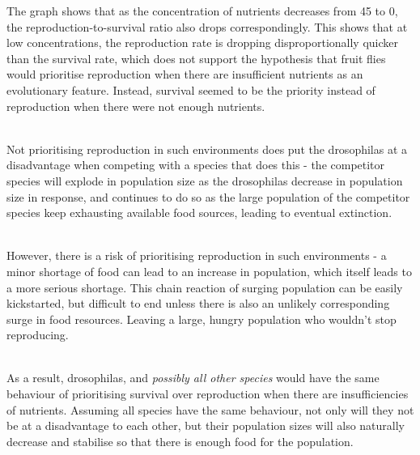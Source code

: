 \documentclass{article}
\begin{document}
\noindent
The graph shows that as the concentration of nutrients decreases from 45 to 0, the reproduction-to-survival ratio also drops correspondingly. This shows that at low concentrations, the reproduction rate is dropping disproportionally quicker than the survival rate, which does not support the hypothesis that fruit flies would prioritise reproduction when there are insufficient nutrients as an evolutionary feature. Instead, survival seemed to be the priority instead of reproduction when there were not enough nutrients.

\noindent\\
Not prioritising reproduction in such environments does put the drosophilas at a disadvantage when competing with a species that does this - the competitor species will explode in population size as the drosophilas decrease in population size in response, and continues to do so as the large population of the competitor species keep exhausting available food sources, leading to eventual extinction.

\noindent\\
However, there is a risk of prioritising reproduction in such environments - a minor shortage of food can lead to an increase in population, which itself leads to a more serious shortage. This chain reaction of surging population can be easily kickstarted, but difficult to end unless there is also an unlikely corresponding surge in food resources. Leaving a large, hungry population who wouldn't stop reproducing.

\noindent\\
As a result, drosophilas, and \emph{possibly all other species} would have the same behaviour of prioritising survival over reproduction when there are insufficiencies of nutrients. Assuming all species have the same behaviour, not only will they not be at a disadvantage to each other, but their population sizes will also naturally decrease and stabilise so that there is enough food for the population.


\end{document}
